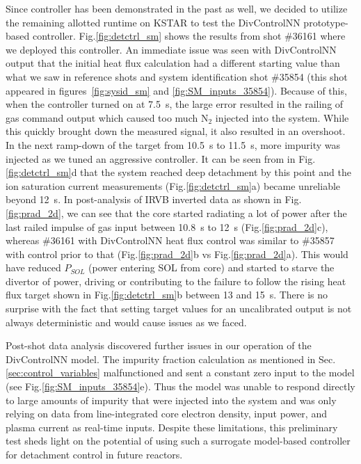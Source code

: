 Since \Afrac{} controller has been demonstrated in the past as well, we decided to utilize the remaining allotted runtime on KSTAR to test the DivControlNN prototype-based controller.
Fig.\ref{fig:detctrl_sm} shows the results from shot \#36161 where we deployed this controller.
An immediate issue was seen with DivControlNN output that the initial heat flux calculation had a different starting value than what we saw in reference shots and system identification shot \#35854 (this shot appeared in figures~\ref{fig:sysid_sm} and \ref{fig:SM_inputs_35854}).
Because of this, when the controller turned on at 7.5~s, the large error resulted in the railing of gas command output which caused too much N$_2$ injected into the system.
While this quickly brought down the measured signal, it also resulted in an overshoot.
In the next ramp-down of the target from 10.5~s to 11.5~s, more impurity was injected as we tuned an aggressive controller.
It can be seen from \Afrac{} in Fig.\ref{fig:detctrl_sm}d that the system reached deep detachment by this point and the ion saturation current measurements (Fig.\ref{fig:detctrl_sm}a) became unreliable beyond 12~s.
In post-analysis of IRVB inverted data as shown in Fig.\ref{fig:prad_2d}, we can see that the core started radiating a lot of power after the last railed impulse of gas input between 10.8~s to 12~s (Fig.\ref{fig:prad_2d}c), whereas \#36161 with DivControlNN heat flux control was similar to \#35857 with \Afrac{} control prior to that (Fig.\ref{fig:prad_2d}b vs Fig.\ref{fig:prad_2d}a).
This would have reduced $P_{SOL}$ (power entering SOL from core) and started to starve the divertor of power, driving or contributing to the failure to follow the rising heat flux target shown in Fig.\ref{fig:detctrl_sm}b between 13 and 15~s.
There is no surprise with the fact that setting target values for an uncalibrated output is not always deterministic and would cause issues as we faced.

Post-shot data analysis discovered further issues in our operation of the DivControlNN model.
The impurity fraction calculation as mentioned in Sec.\ref{sec:control_variables} malfunctioned and sent a constant zero input to the model (see Fig.\ref{fig:SM_inputs_35854}e).
Thus the model was unable to respond directly to large amounts of impurity that were injected into the system and was only relying on data from line-integrated core electron density, input power, and plasma current as real-time inputs.
Despite these limitations, this preliminary test sheds light on the potential of using such a surrogate model-based controller for detachment control in future reactors.

